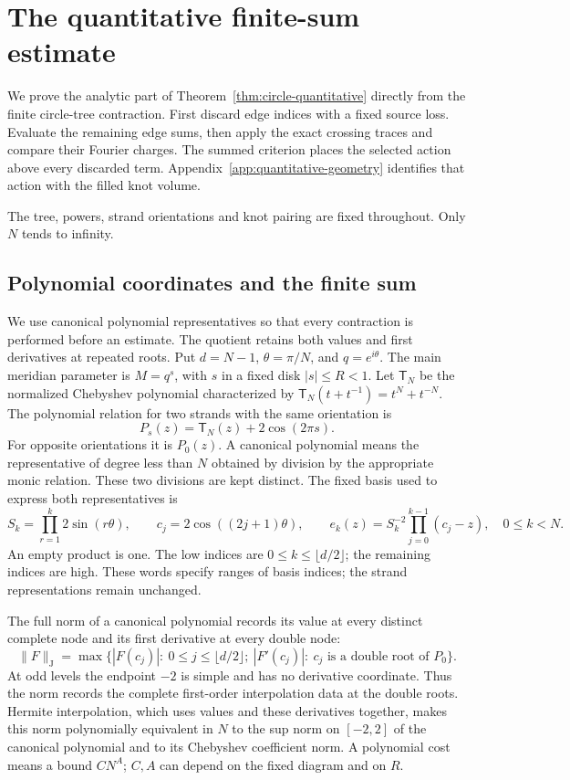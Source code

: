 \chapter{The quantitative finite-sum estimate}\label{app:quantitative-sums}

We prove the analytic part of Theorem~\ref{thm:circle-quantitative}
directly from the finite circle-tree contraction. First discard edge
indices with a fixed source loss. Evaluate the remaining edge sums,
then apply the exact crossing traces and compare their Fourier charges.
The summed criterion places the selected action above every discarded
term. Appendix~\ref{app:quantitative-geometry} identifies that action
with the filled knot volume.

The tree, powers, strand orientations and knot pairing are fixed
throughout. Only $N$ tends to infinity.

\section{Polynomial coordinates and the finite sum}\label{sec:q-coordinates}

We use canonical polynomial representatives so that every contraction
is performed before an estimate. The quotient retains both values and
first derivatives at repeated roots. Put $d=N-1$, $\theta=\pi/N$,
and $q=e^{i\theta}$.
The main meridian parameter is $M=q^s$, with $s$ in a fixed disk
$|s|\le R<1$. Let $\mathsf T_N$ be the normalized Chebyshev polynomial
characterized by
$\mathsf T_N(t+t^{-1})=t^N+t^{-N}$. The polynomial relation for two
strands with the same orientation is
\[
 P_s(z)=\mathsf T_N(z)+2\cos(2\pi s).
\]
For opposite orientations it is $P_0(z)$. A canonical polynomial means
the representative of degree less than $N$ obtained by division by the
appropriate monic relation. These two divisions are kept distinct.
The fixed basis used to express both representatives is
\begin{equation}\label{eq:q-newton-definition}
 S_k=\prod_{r=1}^k2\sin(r\theta),\qquad
 c_j=2\cos((2j+1)\theta),\qquad
 e_k(z)=S_k^{-2}\prod_{j=0}^{k-1}(c_j-z),\quad 0\le k<N.
\end{equation}
An empty product is one. The low indices are
$0\le k\le\lfloor d/2\rfloor$; the remaining indices are high.
These words specify ranges of basis indices; the strand representations
remain unchanged.

The full norm of a canonical polynomial records its value at every
distinct complete node and its first derivative at every double node:
\begin{equation}\label{eq:q-full-norm}
 \|F\|_{\mathrm J}=\max\{|F(c_j)|:\ 0\le j\le\lfloor d/2\rfloor;
 \ |F'(c_j)|:\ c_j\text{ is a double root of }P_0\}.
\end{equation}
At odd levels the endpoint $-2$ is simple and has no derivative
coordinate. Thus the norm records the complete first-order interpolation data
at the double roots. Hermite interpolation, which uses values and these
derivatives together, makes this norm polynomially equivalent in $N$
to the sup norm on $[-2,2]$ of the canonical polynomial and to its
Chebyshev coefficient norm. A polynomial cost means a bound $CN^A$;
$C,A$ can depend on the fixed diagram and on $R$.


